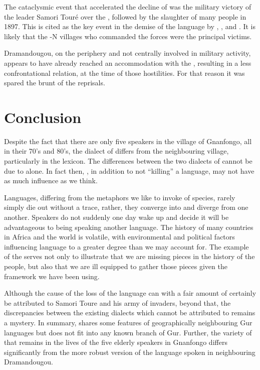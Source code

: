 \documentclass[output=paper,
modfonts
]{langscibook}
\begin{document}
The cataclysmic event that accelerated the decline of  was the military victory of the  leader Samori Touré over the , followed by the slaughter of many  people in 1897. This is cited as the key event in the demise of the language by \citet{Hébert1958}, \citet[31]{LeMoal1980}, and \citet[2]{Winkelmann1998}. It is likely that the -N villages who commanded the  forces were the principal victims.

Dramandougou, on the periphery and not centrally involved in military activity, appears to have already reached an accommodation with the , resulting in a less confrontational relation, at the time of those hostilities. For that reason it was spared the brunt of the reprisals.

\section{Conclusion}\label{sec:hangtan:6}

Despite the fact that there are only five speakers in the village of Gnanfongo, all in their 70’s and 80’s, the dialect of  differs from the neighbouring village, particularly in the lexicon. The differences between the two dialects of  cannot be due to  alone. In fact then, , in addition to not ``killing'' a language, may not have as much influence as we think.

Languages, differing from the metaphors we like to invoke of species, rarely simply die out without a trace, rather, they converge into and diverge from one another. Speakers do not suddenly one day wake up and decide it will be advantageous to being speaking another language. The history of many countries in Africa and the world is volatile, with environmental and political factors influencing language to a greater degree than we may account for. The example of the  serves not only to illustrate that we are missing pieces in the history of the people, but also that we are ill equipped to gather those pieces given the framework we have been using.

Although the cause of the loss of the  language can with a fair amount of certainly be attributed to Samori Toure and his army of invaders, beyond that, the discrepancies between the existing  dialects which cannot be attributed to  remains a mystery. In summary,  shares some features of geographically neighbouring Gur languages but does not fit into any known branch of Gur. Further, the variety of  that remains in the lives of the five elderly speakers in Gnanfongo differs significantly from the more robust version of the language spoken in neighbouring Dramandougou.
\end{document}
